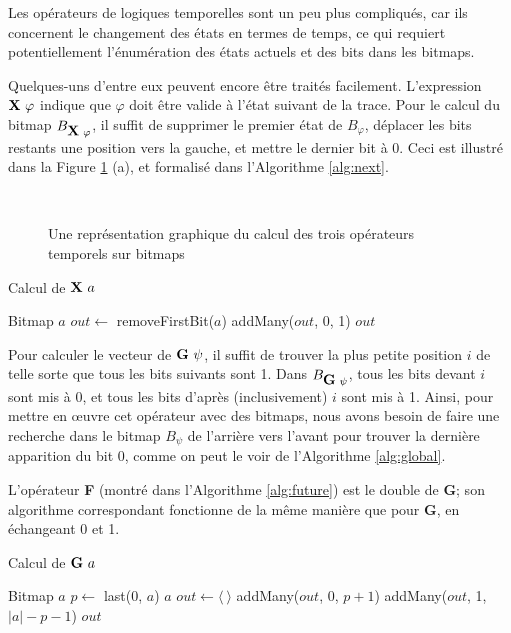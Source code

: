 Les opérateurs de logiques temporelles sont un peu plus compliqués, car ils concernent le changement des états en termes de temps, ce qui requiert potentiellement l'énumération des états actuels et des bits dans les bitmaps.

Quelques-uns d'entre eux peuvent encore être traités facilement. L'expression $\mathop{\mbox{\textbf{X}}}\,\varphi$ indique que $\varphi$ doit être valide à l'état suivant de la trace. Pour le calcul du bitmap $B_{\mathop{\mbox{\textbf{X}}}\,\varphi}$, il suffit de supprimer le premier état de $B_\varphi$, déplacer les bits restants une position vers la gauche, et mettre le dernier bit à 0. Ceci est illustré dans la Figure \ref{fig:patterns} (a), et formalisé dans l'Algorithme \ref{alg:next}.

\begin{figure}
\centering
{}~~~
~~~
\caption{Une représentation graphique du calcul des trois opérateurs temporels sur bitmaps}
\label{fig:patterns}
\end{figure}

\begin{algorithm}
\caption{Calcul de $\mathop{\mbox{\textbf{X}}}\, a$}
\label{alg:next}
\begin{algorithmic}[1]
\Require Bitmap $a$
\State $out \gets$ removeFirstBit($a$)
\State addMany($out$, 0, 1)
\State \Return $out$
\end{algorithmic}
\end{algorithm}

Pour calculer le vecteur de $\mathop{\mbox{\textbf{G}}}\,\psi$, il suffit de trouver la plus petite position $i$ de telle sorte que tous les bits suivants sont 1. Dans $B_{\mathop{\mbox{\textbf{G}}}\,\psi} $, tous les bits devant $i$ sont mis à 0, et tous les bits d'après (inclusivement) $i$ sont mis à 1. Ainsi, pour mettre en \oe{}uvre cet opérateur avec des bitmaps, nous avons besoin de faire une recherche dans le bitmap $B_{\psi}$ de l'arrière vers l'avant pour trouver la dernière apparition du bit 0, comme on peut le voir de l'Algorithme \ref{alg:global}.

L'opérateur \textbf{F} (montré dans l'Algorithme \ref{alg:future}) est le double de \textbf{G}; son algorithme correspondant fonctionne de la même manière que pour \textbf{G}, en échangeant 0 et 1.

\begin{algorithm}
\caption{Calcul de $\mathop{\mbox{\textbf{G}}}\, a$}
\label{alg:global}
\begin{algorithmic}[1]
\Require Bitmap $a$
\State $p \gets$ last(0, $a$)
  \State \Return $a$
\Else
  \State $out \gets \langle~\rangle$
  \State addMany($out$, 0, $p + 1$)
  \State addMany($out$, 1, $|a| - p - 1$)
  \State \Return $out$
\EndIf
\end{algorithmic}
\end{algorithm}

